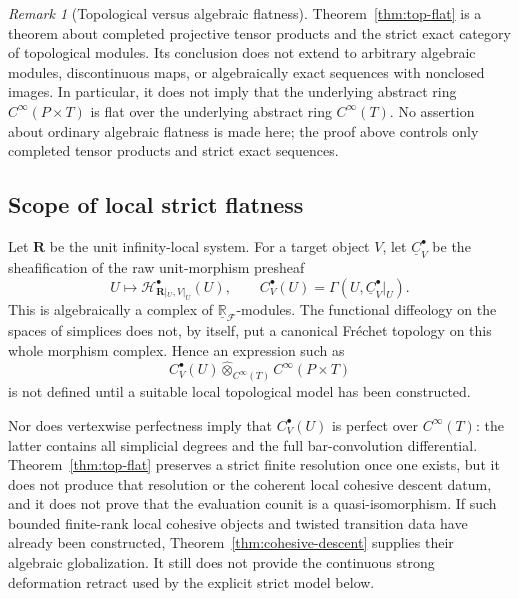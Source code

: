 \documentclass[12pt]{amsart}
\theoremstyle{definition}
\theoremstyle{remark}
\newtheorem{rem}[thm]{Remark}
\numberwithin{equation}{section}
\newcommand{\CF}{{\mathcal F}}
\newcommand{\R}{{\mathbb{R}}}
\newcommand{\1}{{\mathbb{1}}}
\begin{document}
\begin{rem}[Topological versus algebraic flatness]
\label{rem:flatness}
Theorem~\ref{thm:top-flat} is a theorem about completed projective
tensor products and the strict exact category of topological modules.
Its conclusion does not extend to arbitrary algebraic modules,
discontinuous maps, or algebraically exact sequences with nonclosed
images.  In particular, it does not imply that the underlying abstract
ring $C^\infty(P\times T)$ is flat over the underlying abstract ring
$C^\infty(T)$.  No assertion about ordinary algebraic flatness is made
here; the proof above controls only completed tensor products and
strict exact sequences.
\end{rem}

\subsection{Scope of local strict flatness}

Let $\mathbf R$ be the unit infinity-local system.  For a target object
$V$, let $\underline C_V^\bullet$ be the sheafification of the raw
unit-morphism presheaf
\[
 U\longmapsto
 \mathcal H^\bullet_{\mathbf R|_U,V|_U}(U),
\qquad
 C_V^\bullet(U)
 =
 \Gamma(U,\underline C_V^\bullet|_U).
\]
This is algebraically a complex of
$\underline{\R}_{\CF}$-modules.  The functional diffeology on the
spaces of simplices does not, by itself, put a canonical Fr\'echet
topology on this whole morphism complex.  Hence an expression such as
\[
 C_V^\bullet(U)
 \widehat\otimes_{C^\infty(T)}C^\infty(P\times T)
\]
is not defined until a suitable local topological model has been
constructed.

Nor does vertexwise perfectness imply that $C_V^\bullet(U)$ is perfect
over $C^\infty(T)$: the latter contains all simplicial degrees and the
full bar-convolution differential.  Theorem~\ref{thm:top-flat}
preserves a strict finite resolution once one exists, but it does not
produce that resolution or the coherent local cohesive descent datum,
and it does not prove that the evaluation counit is a quasi-isomorphism.
If such bounded finite-rank local cohesive objects and twisted
transition data have already been constructed,
Theorem~\ref{thm:cohesive-descent} supplies their algebraic
globalization.  It still does not provide the continuous strong
deformation retract used by the explicit strict model below.
\end{document}
